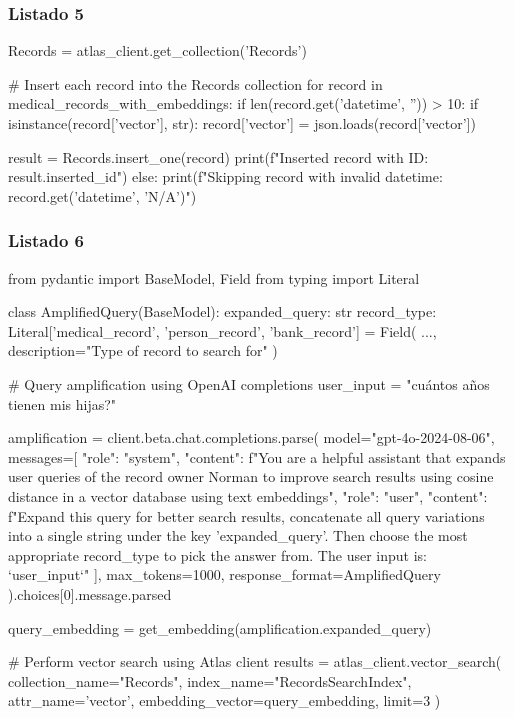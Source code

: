 \subsubsection{Listado 5}
\label{anexo:code-4-4-2-5}

\begin{APACode}
Records = atlas_client.get_collection('Records')

# Insert each record into the Records collection 
for record in medical_records_with_embeddings:
    if len(record.get('datetime', '')) > 10:
        if isinstance(record['vector'], str):
            record['vector'] = json.loads(record['vector'])
        
        result = Records.insert_one(record)
        print(f"Inserted record with ID: {result.inserted_id}")
    else:
        print(f"Skipping record with invalid datetime: {record.get('datetime', 'N/A')}")
\end{APACode}

\subsubsection{Listado 6}
\label{anexo:code-4-4-2-6}

\begin{APACode}
from pydantic import BaseModel, Field
from typing import Literal

class AmplifiedQuery(BaseModel): 
    expanded_query: str
    record_type: Literal['medical_record', 'person_record', 'bank_record'] = Field(
        ...,
        description="Type of record to search for"
    )

# Query amplification using OpenAI completions 
user_input = "cuántos años tienen mis hijas?"

amplification = client.beta.chat.completions.parse(
    model="gpt-4o-2024-08-06",
    messages=[
        {"role": "system", "content": f"You are a helpful assistant that expands user queries of the record owner Norman to improve search results using cosine distance in a vector database using text embeddings"},
        {"role": "user", "content": f"Expand this query for better search results, concatenate all query variations into a single string under the key 'expanded_query'. Then choose the most appropriate record_type to pick the answer from. The user input is: `{user_input}`"}
    ],
    max_tokens=1000, 
    response_format=AmplifiedQuery
).choices[0].message.parsed

query_embedding = get_embedding(amplification.expanded_query)

# Perform vector search using Atlas client 
results = atlas_client.vector_search(
    collection_name="Records", 
    index_name="RecordsSearchIndex", 
    attr_name='vector', 
    embedding_vector=query_embedding, 
    limit=3
)
\end{APACode}

